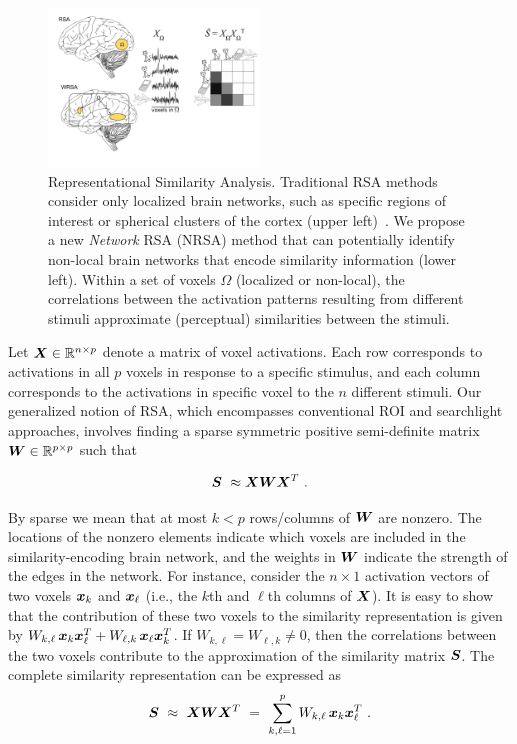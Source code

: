 \begin{figure}[!h]
	\centering
    \includegraphics[width=0.5\textwidth]{figures/WRSA.pdf}
  \caption{Representational Similarity Analysis. Traditional RSA methods consider only
    localized brain networks, such as specific regions of interest or spherical clusters
    of the cortex (upper left)~\cite{RSA,searchlight}. We propose a new {\em Network} RSA
    (NRSA) method that can potentially identify non-local brain networks that encode
    similarity information (lower left). Within a set of voxels $\Omega$ (localized or
    non-local), the correlations between the activation patterns resulting from different
    stimuli approximate (perceptual) similarities between the stimuli. } \label{Fig:WRSA}
  \label{fig.fitting}
\end{figure}

Let $\boldsymbol{X} \in {\mathbb R}^{n\times p}$ denote a matrix of voxel activations.
Each row corresponds to activations in all $p$ voxels in response to a specific stimulus,
and each column corresponds to the activations in specific voxel to the $n$ different
stimuli. Our generalized notion of RSA, which encompasses conventional ROI \cite{RSA} and
searchlight \cite{searchlight} approaches, involves finding a sparse symmetric positive
semi-definite matrix $\boldsymbol{W}\in {\mathbb R}^{p\times p}$ such that

$$\bS \ \approx \bX \bW \bX^T \ .$$

By sparse we mean that at most $k<p$ rows/columns of $\boldsymbol{W}$ are nonzero. The locations of
the nonzero elements indicate which voxels are included in the similarity-encoding brain
network, and the weights in $\boldsymbol{W}$ indicate the strength of the edges in the network. For
instance, consider the $n\times 1$ activation vectors of two voxels $\boldsymbol{x}_k$ and
$\boldsymbol{x}_{\ell}$ (i.e., the $k$th and $\ell$th columns of $\boldsymbol{X}$). It is easy to show that the
contribution of these two voxels to the similarity representation is given by $ W_{k,\ell}
\, \boldsymbol{x}_k \boldsymbol{x}_{\ell}^T + W_{\ell,k} \, \boldsymbol{x}_\ell \boldsymbol{x}_{k}^T$. If $W_{k,\ell}=W_{\ell,k}\neq
0$, then the correlations between the two voxels contribute to the approximation of the
similarity matrix $\boldsymbol{S}$. The complete similarity representation can be expressed as
$$\bS \ \approx \ \bX\bW\bX^T \ = \ \sum_{k,\ell=1}^p W_{k,\ell} \, \bx_k \bx_{\ell}^T \ .$$

